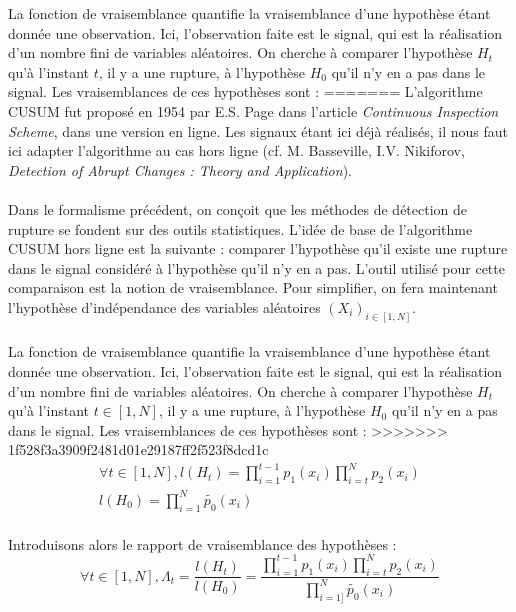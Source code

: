 \documentclass[french,12pt,notitlepage]{report}
\begin{document}
	La fonction de vraisemblance quantifie la vraisemblance d'une hypothèse étant donnée une observation.
	Ici, l'observation faite est le signal, qui est la réalisation d'un nombre fini de variables aléatoires.
	On cherche à comparer l'hypothèse $H_t$ qu'à l'instant $t$, il y a une rupture, à l'hypothèse $H_0$ qu'il n'y en a pas dans le signal.
	Les vraisemblances de ces hypothèses sont :
=======
	L'algorithme CUSUM fut proposé en 1954 par E.S. Page dans l'article \textit{Continuous Inspection Scheme}, dans une version en ligne. Les signaux étant ici déjà réalisés, il nous faut ici adapter l'algorithme au cas hors ligne (cf. M. Basseville, I.V. Nikiforov, \textit{Detection of Abrupt Changes : Theory and Application}).
	\\ \\
	Dans le formalisme précédent, on conçoit que les méthodes de détection de rupture se fondent sur des outils statistiques. L'idée de base de l'algorithme CUSUM hors ligne est la suivante : comparer l'hypothèse qu'il existe une rupture dans le signal considéré à l'hypothèse qu'il n'y en a pas. L'outil utilisé pour cette comparaison est la notion de vraisemblance. Pour simplifier, on fera maintenant l'hypothèse d'indépendance des variables aléatoires $(X_i)_{i \in [1,N]}$.
	\\ \\
	La fonction de vraisemblance quantifie la vraisemblance d'une hypothèse étant donnée une observation. Ici, l'observation faite est le signal, qui est la réalisation d'un nombre fini de variables aléatoires. On cherche à comparer l'hypothèse $H_t$ qu'à l'instant $t \in [1, N]$, il y a une rupture, à l'hypothèse $H_0$ qu'il n'y en a pas dans le signal. Les vraisemblances de ces hypothèses sont :
>>>>>>> 1f528f3a3909f2481d01e29187ff2f523f8dcd1c
	\begin{equation}
	\begin{array}{ll}
		\forall t \in [1, N],l(H_t) = \prod_{i = 1}^{t-1} p_1(x_i) \prod_{i = t}^{N} p_2(x_i) \\
		l(H_0) = \prod_{i = 1}^N \tilde{p_0}(x_i) \\
	\end{array}	
	\end{equation}

	Introduisons alors le rapport de vraisemblance des hypothèses :
	\begin{equation}
		\forall t \in [1, N], \Lambda_t = \frac{l(H_t)}{l(H_0)} = \frac{\prod_{i = 1}^{t-1} p_1(x_i) \prod_{i = t}^{N} p_2(x_i)}{\prod_{i = 1]}^{N} \tilde{p_0}(x_i)}
	\end{equation}
\end{document}
